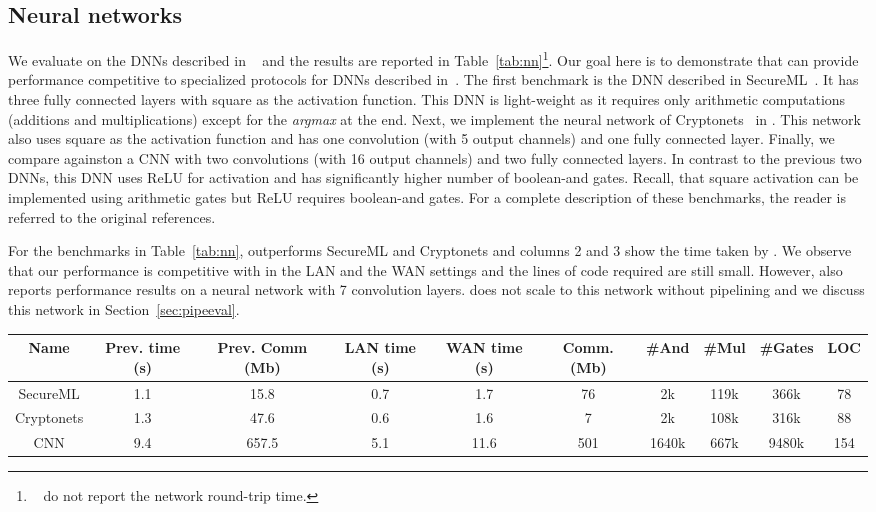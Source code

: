 
\subsection{Neural networks}
We evaluate \tool on the DNNs described in \minion~\cite{minionn} and the results are reported in Table~\ref{tab:nn}\footnote{~\cite{minionn} do not report the network round-trip time.}.
Our goal here is to demonstrate that \tool
can provide performance competitive to specialized protocols for DNNs described in~\cite{secureml,cryptonets,minionn}. 
The first benchmark  is the DNN described in SecureML~\cite{secureml}.
It has three fully connected layers with square as the activation function.
This DNN is light-weight as it requires only arithmetic computations (additions and multiplications)
except for the {\it argmax} at the end.
Next, we implement the neural network of Cryptonets~\cite{cryptonets} in \tool.
This network also uses square as the activation function and has one convolution (with 5 output channels) and one fully connected layer.
Finally, we compare against\minion on a CNN
with two convolutions (with 16 output channels) and two fully connected layers.
In contrast to the previous two DNNs, this DNN uses ReLU for activation and
has significantly higher number of boolean-and gates.
Recall, that square activation can be implemented using arithmetic gates but ReLU requires boolean-and gates.  For a complete description of these benchmarks,  the reader is referred to the original references.

For the benchmarks in Table~\ref{tab:nn}, \minion
outperforms SecureML and Cryptonets and columns 2 and 3 show the time taken by \minion.
We observe that our performance is competitive with \minion in the LAN and the WAN settings and the lines of code required are still small.
However, \minion also reports performance results on a neural network with 7 convolution layers.
\tool does not scale to this network without pipelining and we discuss this network in Section~\ref{sec:pipeeval}.

\begin{table*}
\begin{tabular}{c|c|c|c |c|c|c|c|c|c}
Name  & Prev. time (s) & Prev. Comm (Mb) & LAN time (s) & WAN time (s) & Comm. (Mb)  & \#And & \#Mul & \#Gates & LOC\\
\hline
SecureML   &  1.1 & 15.8 & 0.7 & 1.7  & 76   &  2k   & 119k & 366k   & 78\\
\hline
Cryptonets &  1.3 & 47.6 & 0.6 & 1.6  & 7    & 2k    & 108k & 316k & 88\\
\hline
CNN        &  9.4 & 657.5& 5.1 & 11.6 & 501  & 1640k & 667k & 9480k & 154\\
\hline
\end{tabular}

 \caption{Neural network benchmarks}
 \label{tab:nn} 
\end{table*}


